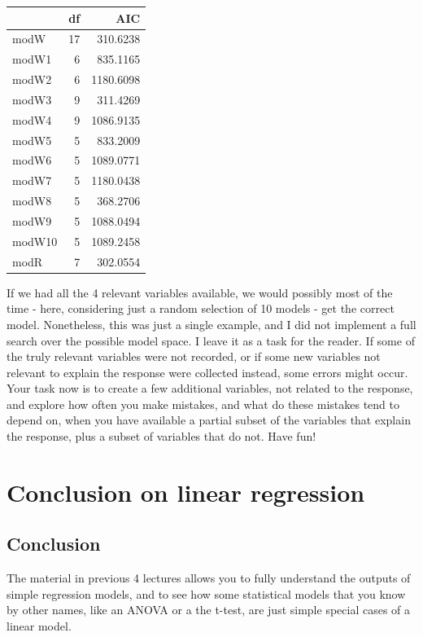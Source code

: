 \documentclass[
]{book}
\begin{document}
\begin{tabular}{l|r|r}
\hline
  & df & AIC\\
\hline
modW & 17 & 310.6238\\
\hline
modW1 & 6 & 835.1165\\
\hline
modW2 & 6 & 1180.6098\\
\hline
modW3 & 9 & 311.4269\\
\hline
modW4 & 9 & 1086.9135\\
\hline
modW5 & 5 & 833.2009\\
\hline
modW6 & 5 & 1089.0771\\
\hline
modW7 & 5 & 1180.0438\\
\hline
modW8 & 5 & 368.2706\\
\hline
modW9 & 5 & 1088.0494\\
\hline
modW10 & 5 & 1089.2458\\
\hline
modR & 7 & 302.0554\\
\hline
\end{tabular}

If we had all the 4 relevant variables available, we would possibly most of the time - here, considering just a random selection of 10 models - get the correct model. Nonetheless, this was just a single example, and I did not implement a full search over the possible model space. I leave it as a task for the reader. If some of the truly relevant variables were not recorded, or if some new variables not relevant to explain the response were collected instead, some errors might occur. Your task now is to create a few additional variables, not related to the response, and explore how often you make mistakes, and what do these mistakes tend to depend on, when you have available a partial subset of the variables that explain the response, plus a subset of variables that do not. Have fun!

\hypertarget{conclusion-on-linear-regression}{%
\chapter{Conclusion on linear regression}\label{conclusion-on-linear-regression}}

\hypertarget{conclusion}{%
\section{Conclusion}\label{conclusion}}

The material in previous 4 lectures allows you to fully understand the outputs of simple regression models, and to see how some statistical models that you know by other names, like an ANOVA or a the t-test, are just simple special cases of a linear model.
\end{document}
